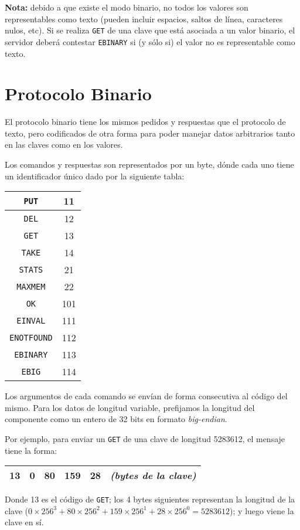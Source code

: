 \documentclass[tp]{lcc}
\begin{document}
\textbf{Nota:} debido a que existe el modo binario, no todos
los valores son representables como texto (pueden incluir espacios,
saltos de línea, caracteres nulos, etc). Si se realiza \texttt{GET}
de una clave que está asociada a un valor binario, el servidor deberá
contestar \texttt{EBINARY} si (y sólo si) el valor no es representable
como texto.

\section{Protocolo Binario}

El protocolo binario tiene los mismos pedidos y respuestas que el
protocolo de texto, pero codificados de otra forma para poder manejar
datos arbitrarios tanto en las claves como en los valores.

Los comandos y respuestas son representados por un byte, dónde cada uno
tiene un identificador único dado por la siguiente tabla:

\begin{center}
    \begin{tabular}{|c|c|}
        \hline
        \texttt{PUT} & 11 \\
        \hline
        \texttt{DEL} & 12 \\
        \hline
        \texttt{GET} & 13 \\
        \hline
        \texttt{TAKE} & 14 \\
        \hline
        \texttt{STATS} & 21 \\
        \hline
        \texttt{MAXMEM} & 22 \\
        \hline
        \texttt{OK} & 101 \\
        \hline
        \texttt{EINVAL} & 111 \\
        \hline
        \texttt{ENOTFOUND} & 112 \\
        \hline
        \texttt{EBINARY} & 113 \\
        \hline
        \texttt{EBIG} & 114 \\
        \hline
    \end{tabular}
\end{center}

Los argumentos de cada comando se envían de forma consecutiva al
código del mismo. Para los datos de longitud variable, prefijamos
la longitud del componente como un entero de 32 bits en formato
\emph{big-endian}.

Por ejemplo, para enviar un \texttt{GET} de una clave de longitud
5283612, el mensaje tiene la forma:
\begin{center}
    \begin{tabular}{|c|c|c|c|c|c|}
        \hline
        13 & 0 & 80 & 159 & 28 & \emph{(bytes de la clave)} \\
        \hline
    \end{tabular}
\end{center}
Donde 13 es el código de \texttt{GET}; los 4 bytes siguientes
representan la longitud de la clave ($0 \times 256^3 + 80 \times 256^2 +
159\times 256^1 + 28 \times 256^0 = 5283612$); y luego viene la clave en sí.
\end{document}
